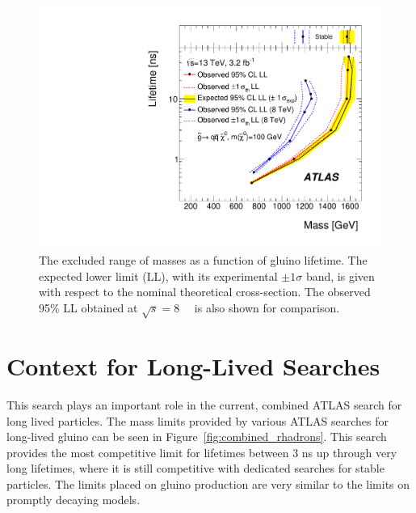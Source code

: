 \begin{figure}[htbp]
\centering
\includegraphics[width=\fullfig]{figures/taumass_exclusion.pdf}  
\caption{The excluded range of masses as a function of gluino lifetime. The expected lower limit (LL), with its experimental $\pm 1 \sigma$ band, is given with respect to the nominal theoretical cross-section. The observed 95\% LL obtained at $\sqrt{s} = 8$~\TeV~\cite{SUSY-2014-09} is also shown for comparison.}
\label{fig:mass_limits}
\end{figure}


\section{Context for Long-Lived Searches}
This search plays an important role in the current, combined \ac{ATLAS} search for long lived particles.
The mass limits provided by various \ac{ATLAS} searches for long-lived gluino \rhadrons can be seen in Figure~\ref{fig:combined_rhadrons}.
This search provides the most competitive limit for lifetimes between 3 ns up through very long lifetimes, where it is still competitive with dedicated searches for stable particles.
The limits placed on gluino production are very similar to the limits on promptly decaying models.

